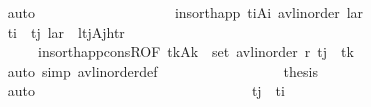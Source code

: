 \begin{isabellebody}
\ \ \ \ \ \ \ \ \ \ \ \ \ \ \ \ \isamarkupfalse%
\ auto\isanewline
\ \ \ \ \ \ \ \ \ \ \ \ \ \ \isamarkupfalse%
\ \isamarkupfalse%
\ {\isachardoublequoteopen}{\isachardot}{\kern0pt}{\isachardot}{\kern0pt}{\isachardot}{\kern0pt}\ {\isacharequal}{\kern0pt}\ insort{\isacharunderscore}{\kern0pt}happ\ {\isacharparenleft}{\kern0pt}t\isactrlsub i{\isacharcomma}{\kern0pt}A\isactrlsub i{\isacharparenright}{\kern0pt}\ {\isacharparenleft}{\kern0pt}avl{\isacharunderscore}{\kern0pt}inorder\ {\isasymlangle}l{\isacharcomma}{\kern0pt}a{\isacharcomma}{\kern0pt}r{\isasymrangle}{\isacharparenright}{\kern0pt}{\isachardoublequoteclose}\isanewline
\ \ \ \ \ \ \ \ \ \ \ \ \ \ \ \ \isamarkupfalse%
\ {\isacartoucheopen}t\isactrlsub i\ {\isacharequal}{\kern0pt}\ t\isactrlsub j{\isacartoucheclose}\ {\isacartoucheopen}{\isasymlangle}l{\isacharcomma}{\kern0pt}a{\isacharcomma}{\kern0pt}r{\isasymrangle}\ {\isacharequal}{\kern0pt}\ {\isasymlangle}l{\isacharcomma}{\kern0pt}{\isacharparenleft}{\kern0pt}{\isacharparenleft}{\kern0pt}t\isactrlsub j{\isacharcomma}{\kern0pt}A\isactrlsub j{\isacharparenright}{\kern0pt}{\isacharcomma}{\kern0pt}ht{\isacharparenright}{\kern0pt}{\isacharcomma}{\kern0pt}r{\isasymrangle}{\isacartoucheclose}\ \isanewline
\ \ \ \ \ \ \ \ \ \ \ \ \ \ \ \ \ \ \ \ \ \ insort{\isacharunderscore}{\kern0pt}happ{\isacharunderscore}{\kern0pt}consR{\isacharbrackleft}{\kern0pt}OF\ {\isacartoucheopen}{\isasymforall}{\isacharparenleft}{\kern0pt}t\isactrlsub k{\isacharcomma}{\kern0pt}A\isactrlsub k{\isacharparenright}{\kern0pt}\ {\isasymin}\ set\ {\isacharparenleft}{\kern0pt}avl{\isacharunderscore}{\kern0pt}inorder\ r{\isacharparenright}{\kern0pt}{\isachardot}{\kern0pt}\ t\isactrlsub j\ {\isacharless}{\kern0pt}\ t\isactrlsub k{\isacartoucheclose}{\isacharbrackright}{\kern0pt}\ \isanewline
\ \ \ \ \ \ \ \ \ \ \ \ \ \ \ \ \isamarkupfalse%
\ {\isacharparenleft}{\kern0pt}auto\ simp{\isacharcolon}{\kern0pt}\ avl{\isacharunderscore}{\kern0pt}inorder{\isacharunderscore}{\kern0pt}def{\isacharparenright}{\kern0pt}\isanewline
\ \ \ \ \ \ \ \ \ \ \ \ \ \ \isamarkupfalse%
\ \isamarkupfalse%
\ {\isacharquery}{\kern0pt}thesis\isanewline
\ \ \ \ \ \ \ \ \ \ \ \ \ \ \ \ \isamarkupfalse%
\ auto\ \ \isanewline
\ \ \ \ \ \ \ \ \ \ \ \ \isamarkupfalse%
\isanewline
\ \ \ \ \ \ \ \ \ \ \ \ \ \ \isamarkupfalse%
\ {\isachardoublequoteopen}t\isactrlsub j\ {\isacharless}{\kern0pt}\ t\isactrlsub i{\isachardoublequoteclose}\isanewline

\end{isabellebody}
